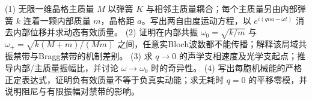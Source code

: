 (1) 无限一维晶格主质量 \(M\) 以弹簧 \(K\) 与相邻主质量耦合；每个主质量另由内部弹簧 \(k\) 连着一颗内部质量 \(m\)，晶格距 \(a\)。写出两自由度运动方程，以 \(e^{i(qna-\omega t)}\) 消去内部位移并求动态有效质量。
(2) 证明在内部共振 \(\omega_0=\sqrt{k/m}\) 与 \(\omega_+=\sqrt{k(M+m)/(Mm)}\) 之间，任意实Bloch波数都不能传播；解释该局域共振禁带与Bragg禁带的机制差别。
(3) 求 \(q\to0\) 的声学支相速度及光学支起点；推导内部/主质量振幅比，并讨论 \(\omega\to\omega_0\) 时的奇异性。
(4) 写出每胞机械能的严格正定表达式，证明负有效质量不等于负真实动能；求无耗时 \(q=0\) 的平移零模，并说明阻尼与有限振幅对禁带的影响。
